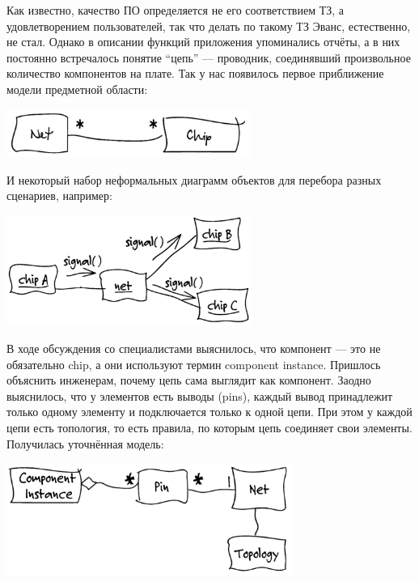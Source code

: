 \documentclass[a5paper]{article}
\begin{document}
Как известно, качество ПО определяется не его соответствием ТЗ, а удовлетворением пользователей, так что делать по такому ТЗ Эванс, естественно, не стал. Однако в описании функций приложения упоминались отчёты, а в них постоянно встречалось понятие ``цепь'' --- проводник, соединявший произвольное количество компонентов на плате. Так у нас появилось первое приближение модели предметной области:

\begin{center}
	\includegraphics[width=0.6\textwidth]{netClasses.png}
\end{center}

И некоторый набор неформальных диаграмм объектов для перебора разных сценариев, например:

\begin{center}
	\includegraphics[width=0.6\textwidth]{netObjects.png}
\end{center}

В ходе обсуждения со специалистами выяснилось, что компонент --- это не обязательно chip, а они используют термин component instance. Пришлось объяснить инженерам, почему цепь сама выглядит как компонент. Заодно выяснилось, что у элементов есть выводы (pins), каждый вывод принадлежит только одному элементу и подключается только к одной цепи. При этом у каждой цепи есть топология, то есть правила, по которым цепь соединяет свои элементы. Получилась уточнённая модель:

\begin{center}
	\includegraphics[width=0.7\textwidth]{topology.png}
\end{center}
\end{document}
